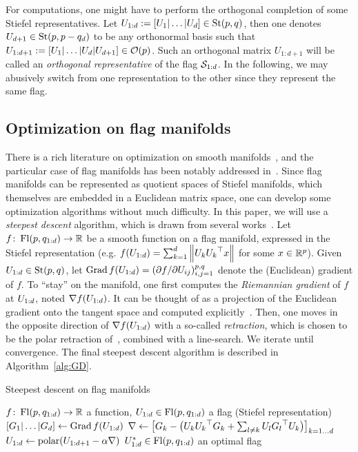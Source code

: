 \begin{remark}
For computations, one might have to perform the orthogonal completion of some Stiefel representatives.
Let $U_{1:d} := [U_1|\dots|U_d] \in \operatorname{St}(p, q)$, then one denotes $U_{d+1} \in \operatorname{St}(p, p-q_d)$ to be any orthonormal basis such that $U_{1:d+1} := [U_1|\dots|U_d|U_{d+1}] \in \mathcal{O}(p)$. Such an orthogonal matrix $U_{1:d+1}$ will be called an \emph{orthogonal representative} of the flag $\mathcal{S}_{1:d}$. In the following, we may abusively switch from one representation to the other since they represent the same flag.
\end{remark}

\subsection{Optimization on flag manifolds}
There is a rich literature on optimization on smooth manifolds~\citep{edelman_geometry_1998,absil_optimization_2009,boumal_introduction_2023}, and the particular case of flag manifolds has been notably addressed in~\citet{ye_optimization_2022,zhu_practical_2024}. Since flag manifolds can be represented as quotient spaces of Stiefel manifolds, which themselves are embedded in a Euclidean matrix space, one can develop some optimization algorithms without much difficulty.
In this paper, we will use a \textit{steepest descent} algorithm, which is drawn from several works~\citep{chikuse_statistics_2003,nishimori_riemannian_2006,ye_optimization_2022,zhu_practical_2024}. 
Let $f\colon \operatorname{Fl}(p, q_{1:d}) \to \mathbb{R}$ be a smooth function on a flag manifold, expressed in the Stiefel representation (e.g. $f(U_{1:d}) = \sum_{k=1}^d \left\lVert{U_k} {U_k}^\top x\right\rVert $ for some $x\in\mathbb{R}^p$). Given $U_{1:d} \in \operatorname{St}(p, q)$, let $\operatorname{Grad} f (U_{1:d}) = ({\partial f}/{\partial U_{ij}})_{i, j = 1}^{p, q}$ denote the (Euclidean) gradient of $f$. To ``stay'' on the manifold, one first computes the \textit{Riemannian gradient} of $f$ at $U_{1:d}$, noted $\nabla f (U_{1:d})$. It can be thought of as a projection of the Euclidean gradient onto the tangent space and computed explicitly~\citep{nishimori_riemannian_2006,ye_optimization_2022}.
Then, one moves in the opposite direction of $\nabla f (U_{1:d})$ with a so-called \textit{retraction}, which is chosen to be the polar retraction of~\citet[Eq.~(49)]{zhu_practical_2024}, combined with a line-search.
We iterate until convergence.
The final steepest descent algorithm is described in Algorithm~\ref{alg:GD}.
\begin{algorithm}
\caption{Steepest descent on flag manifolds}\label{alg:GD}
\begin{algorithmic}
\Require $f\colon \operatorname{Fl}(p, q_{1:d}) \to \mathbb{R}$ a function, $U_{1:d} \in \operatorname{Fl}(p, q_{1:d})$ a flag (Stiefel representation)
    \State $[G_1|\dots|G_d] \gets \operatorname{Grad} f (U_{1:d})$ 
	\State $\nabla \gets \bigl[G_k - \bigl(U_k {U_k}^\top G_k + \sum_{l \neq k} U_l {G_l}^\top U_k\bigr)\bigr]_{k=1\dots d}$
	\State $U_{1:d} \gets \operatorname{polar}(U_{1:d+1} - \alpha \nabla)$ 
\EndFor
\Ensure $U_{1:d}^* \in \operatorname{Fl}(p, q_{1:d})$ an optimal flag
\end{algorithmic}
\end{algorithm}
